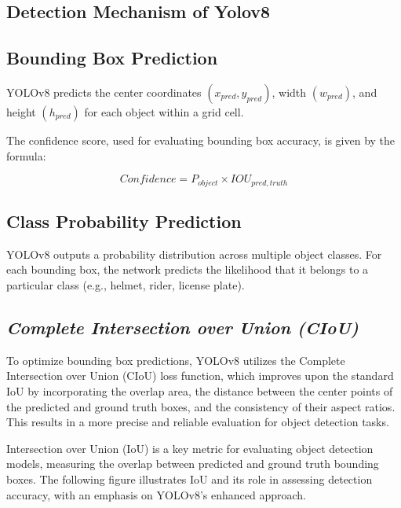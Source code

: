 \begin{refsection}
\section*{Detection Mechanism of Yolov8}

\subsection*{Bounding Box Prediction}

YOLOv8 predicts the center coordinates $(x_{pred}, y_{pred})$, width $(w_{pred})$, 
and height $(h_{pred})$ for each object within a grid cell.

The confidence score, used for evaluating bounding box accuracy, is given by the formula:

\[
Confidence = P_{object} \times IOU_{pred,truth}
\]

\subsection*{Class Probability Prediction}

YOLOv8 outputs a probability distribution across multiple object classes. 
For each bounding box, the network predicts the likelihood that it belongs 
to a particular class (e.g., helmet, rider, license plate).

\subsection*{\textit{Complete Intersection over Union (CIoU)}}

To optimize bounding box predictions, YOLOv8 utilizes the Complete Intersection over Union (CIoU) loss function, which improves upon the standard IoU by incorporating the overlap area, the distance between the center points of the predicted and ground truth boxes, and the consistency of their aspect ratios. This results in a more precise and reliable evaluation for object detection tasks.

Intersection over Union (IoU) is a key metric for evaluating object detection models, measuring the overlap between predicted and ground truth bounding boxes. The following figure illustrates IoU and its role in assessing detection accuracy, with an emphasis on YOLOv8’s enhanced approach.


\end{refsection}

